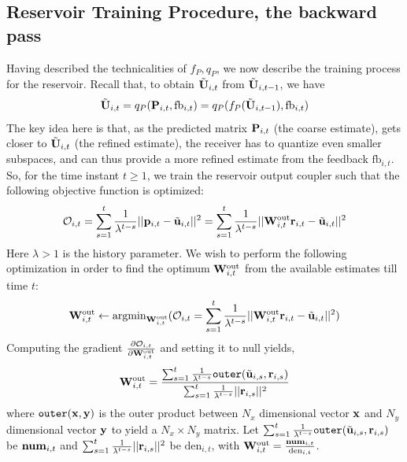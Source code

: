 \documentclass[conference]{IEEEtran}
\begin{document}
\subsection{Reservoir Training Procedure, the backward pass}
\label{train}
\noindent Having described the technicalities of $f_P,q_P$, we now describe the training process for the reservoir.
Recall that, to obtain $\tilde{{\bf U}}_{i,t}$ from  $\tilde{{\bf U}}_{i,t-1}$, we have
\begin{equation}
\tilde{\bU}_{i,t}=q_P(\bP_{i,t},\text{fb}_{i,t})=q_P(f_P(\tilde{\bU}_{i,t-1}),\text{fb}_{i,t})
\label{fpqp}
\end{equation}
The key idea here is that, as the predicted matrix ${\bf P}_{i,t}$ (the coarse estimate), gets closer to $\tilde{{\bf U}}_{i,t}$ (the refined estimate), the receiver has to quantize even smaller subspaces, and can thus provide a more refined estimate from the feedback $\text{fb}_{i,t}$.
So, for the time instant $t\geq 1$, we train the reservoir output coupler such that the following objective function is optimized:
\begin{equation}
\mathcal{O}_{i,t}=\sum_{s=1}^{t}\frac{1}{\lambda^{t-s}}||\bp_{i,t}-\tilde{\bu}_{i,t}||^2=\sum_{s=1}^{t}\frac{1}{\lambda^{t-s}}||\bW_{i,t}^{\text{out}}\br_{i,t}-\tilde{\bu}_{i,t}||^2
\label{oit}
\end{equation}
Here $\lambda>1$ is the history parameter.
We wish to perform the following optimization in order to find the optimum ${\bf W}_{i,t}^{\text{out}}$ from the available estimates till time $t$:
\begin{equation}
\bW_{i,t}^{\text{out}}\gets\text{argmin}_{\bW_{i,t}^{\text{out}}}(\mathcal{O}_{i,t}=\sum_{s=1}^{t}\frac{1}{\lambda^{t-s}}||\bW_{i,t}^{\text{out}}\br_{i,t}-\tilde{\bu}_{i,t}||^2)
\label{getsOpt}
\end{equation}
Computing the gradient $\frac{\partial \mathcal{O}_{i,t}}{\partial {\bf W}_{i,t}^{\text{out}}}$ and setting it to null yields,
\begin{equation}
\bW_{i,t}^{\text{out}}=\frac{\sum_{s=1}^{t}\frac{1}{\lambda^{t-s}}\texttt{outer}(\tilde{\bu}_{i,s},\br_{i,s})}{\sum_{s=1}^{t}\frac{1}{\lambda^{t-s}}||\br_{i,s}||^2}
\label{backpass}
\end{equation}
where $\texttt{outer}({\bf x},{\bf y})$ is the outer product between $N_x$ dimensional vector ${\bf x}$ and $N_y$ dimensional vector ${\bf y}$ to yield a $N_x\times N_y$ matrix.
Let $\sum_{s=1}^{t}\frac{1}{\lambda^{t-s}}\texttt{outer}(\tilde{{\bf u}}_{i,s},{\bf r}_{i,s})$ be $\text{\textbf{num}}_{i,t}$ and $\sum_{s=1}^{t}\frac{1}{\lambda^{t-s}}||{\bf r}_{i,s}||^2$ be $\text{den}_{i,t}$, with ${\bf W}_{i,t}^{\text{out}}=\frac{\text{\textbf{num}}_{i,t}}{\text{den}_{i,t}}$.
\end{document}
